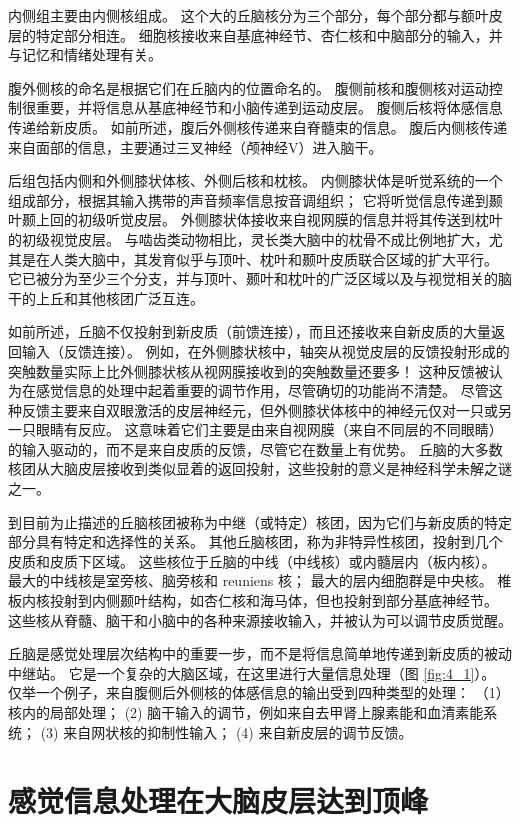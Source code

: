 内侧组主要由内侧核组成。 
这个大的丘脑核分为三个部分，每个部分都与额叶皮层的特定部分相连。 
细胞核接收来自基底神经节、杏仁核和中脑部分的输入，并与记忆和情绪处理有关。


腹外侧核的命名是根据它们在丘脑内的位置命名的。 
腹侧前核和腹侧核对运动控制很重要，并将信息从基底神经节和小脑传递到运动皮层。 
腹侧后核将体感信息传递给新皮质。 
如前所述，腹后外侧核传递来自脊髓束的信息。 
腹后内侧核传递来自面部的信息，主要通过三叉神经（颅神经V）进入脑干。


后组包括内侧和外侧膝状体核、外侧后核和枕核。 
内侧膝状体是听觉系统的一个组成部分，根据其输入携带的声音频率信息按音调组织； 它将听觉信息传递到颞叶颞上回的初级听觉皮层。 
外侧膝状体接收来自视网膜的信息并将其传送到枕叶的初级视觉皮层。 
与啮齿类动物相比，灵长类大脑中的枕骨不成比例地扩大，尤其是在人类大脑中，其发育似乎与顶叶、枕叶和颞叶皮质联合区域的扩大平行。 
它已被分为至少三个分支，并与顶叶、颞叶和枕叶的广泛区域以及与视觉相关的脑干的上丘和其他核团广泛互连。


如前所述，丘脑不仅投射到新皮质（前馈连接），而且还接收来自新皮质的大量返回输入（反馈连接）。 
例如，在外侧膝状核中，轴突从视觉皮层的反馈投射形成的突触数量实际上比外侧膝状核从视网膜接收到的突触数量还要多！ 
这种反馈被认为在感觉信息的处理中起着重要的调节作用，尽管确切的功能尚不清楚。 
尽管这种反馈主要来自双眼激活的皮层神经元，但外侧膝状体核中的神经元仅对一只或另一只眼睛有反应。 
这意味着它们主要是由来自视网膜（来自不同层的不同眼睛）的输入驱动的，而不是来自皮质的反馈，尽管它在数量上有优势。 
丘脑的大多数核团从大脑皮层接收到类似显着的返回投射，这些投射的意义是神经科学未解之谜之一。


到目前为止描述的丘脑核团被称为中继（或特定）核团，因为它们与新皮质的特定部分具有特定和选择性的关系。 其他丘脑核团，称为非特异性核团，投射到几个皮质和皮质下区域。 
这些核位于丘脑的中线（中线核）或内髓层内（板内核）。 
最大的中线核是室旁核、脑旁核和 reuniens 核； 最大的层内细胞群是中央核。 
椎板内核投射到内侧颞叶结构，如杏仁核和海马体，但也投射到部分基底神经节。 
这些核从脊髓、脑干和小脑中的各种来源接收输入，并被认为可以调节皮质觉醒。


丘脑是感觉处理层次结构中的重要一步，而不是将信息简单地传递到新皮质的被动中继站。 
它是一个复杂的大脑区域，在这里进行大量信息处理（图 \ref{fig:4_1}）。 
仅举一个例子，来自腹侧后外侧核的体感信息的输出受到四种类型的处理：
（1）核内的局部处理；
(2) 脑干输入的调节，例如来自去甲肾上腺素能和血清素能系统； 
(3) 来自网状核的抑制性输入； 
(4) 来自新皮层的调节反馈。


\section{感觉信息处理在大脑皮层达到顶峰}

